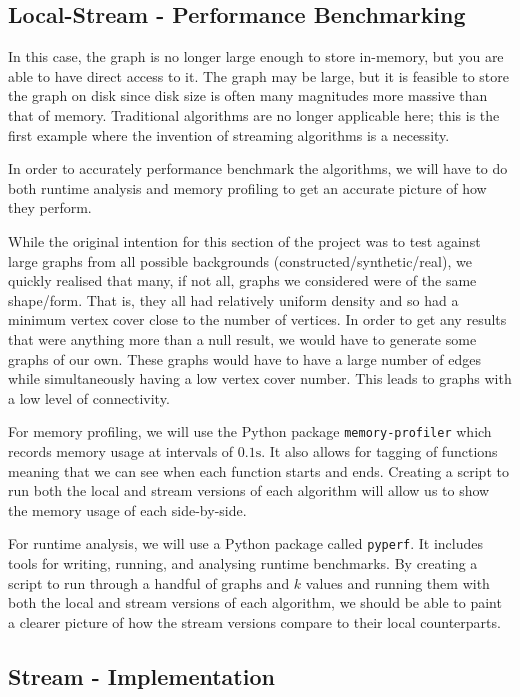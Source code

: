 \subsection{Local-Stream - Performance Benchmarking}

In this case, the graph is no longer large enough to store in-memory, but you
are able to have direct access to it. The graph may be large, but it is
feasible to store the graph on disk since disk size is often many magnitudes
more massive than that of memory. Traditional algorithms are no longer
applicable here; this is the first example where the invention of streaming
algorithms is a necessity.

In order to accurately performance benchmark the algorithms, we will have to do
both runtime analysis and memory profiling to get an accurate picture of how
they perform.

While the original intention for this section of the project was to test
against large graphs from all possible backgrounds
(constructed/synthetic/real), we quickly realised that many, if not all, graphs
we considered were of the same shape/form. That is, they all had relatively
uniform density and so had a minimum vertex cover close to the number of
vertices. In order to get any results that were anything more than a null
result, we would have to generate some graphs of our own. These graphs would
have to have a large number of edges while simultaneously having a low vertex
cover number. This leads to graphs with a low level of connectivity.

For memory profiling, we will use the Python package \texttt{memory-profiler}
which records memory usage at intervals of \(0.1\text{s}\). It also allows for
tagging of functions meaning that we can see when each function starts and
ends. Creating a script to run both the local and stream versions of each
algorithm will allow us to show the memory usage of each side-by-side.

For runtime analysis, we will use a Python package called \texttt{pyperf}. It
includes tools for writing, running, and analysing runtime benchmarks. By
creating a script to run through a handful of graphs and \(k\) values and
running them with both the local and stream versions of each algorithm, we
should be able to paint a clearer picture of how the stream versions compare to
their local counterparts.

\subsection{Stream - Implementation}

